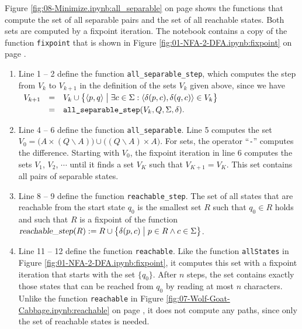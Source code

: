 \noindent
Figure \ref{fig:08-Minimize.ipynb:all_separable} on page \pageref{fig:08-Minimize.ipynb:all_separable} shows the
functions that compute the set of all separable pairs and the set of all reachable states.  Both sets are computed
by a fixpoint iteration.  The notebook contains a copy of the function \texttt{fixpoint} that is shown in Figure
\ref{fig:01-NFA-2-DFA.ipynb:fixpoint} on page \pageref{fig:01-NFA-2-DFA.ipynb:fixpoint}.
\begin{enumerate}
\item Line 1 -- 2 define the function \texttt{all\_separable\_step}, which computes the step from $V_k$ to
      $V_{k+1}$ in the definition of the sets $V_k$ given above, since we have
      \\[0.2cm]
      \hspace*{1.3cm}
      $\begin{array}[t]{lcl}
       V_{k+1} & = & V_k \cup \bigl\{ \pair(p,q) \bigm| \exists c \in \Sigma: \langle \delta(p,c), \delta(q,c)
                     \rangle \in V_k \bigr\} \\[0.1cm]
               & = & \texttt{all\_separable\_step}(V_k, Q, \Sigma, \delta).
       \end{array}$
\item Line 4 -- 6 define the function \texttt{all\_separable}.  Line 5 computes the set
      $V_0 = \bigl(A \times (Q \backslash A)\bigr) \cup \bigl((Q \backslash A) \times A\bigr)$.  For sets, the
      operator ``\texttt{-}'' computes the difference.  Starting with $V_0$, the fixpoint iteration in line 6
      computes the sets $V_1$, $V_2$, $\cdots$ until it finds a set $V_K$ such that $V_{K+1} = V_K$.  This set
      contains all pairs of separable states.
\item Line 8 -- 9 define the function \texttt{reachable\_step}.  The set of all states that are reachable from the
      start state $q_0$ is the smallest set $R$ such that $q_0 \in R$ holds and such that $R$ is a fixpoint of
      the function
      \\[0.2cm]
      \hspace*{1.3cm}
      $\textsl{reachable\_step}(R) := R \cup \bigl\{ \delta(p, c) \bigm| p \in R \wedge c \in \Sigma \bigr\}$.
\item Line 11 -- 12 define the function \texttt{reachable}.  Like the function \texttt{allStates} in Figure
      \ref{fig:01-NFA-2-DFA.ipynb:fixpoint}, it computes this set with a fixpoint iteration that starts with the
      set $\{ q_0 \}$.  After $n$ steps, the set contains exactly those states that can be reached from $q_0$ by
      reading at most $n$ characters.  Unlike the function \texttt{reachable} in Figure
      \ref{fig:07-Wolf-Goat-Cabbage.ipynb:reachable} on page \pageref{fig:07-Wolf-Goat-Cabbage.ipynb:reachable},
      it does not compute any paths, since only the set of reachable states is needed.
\end{enumerate}

